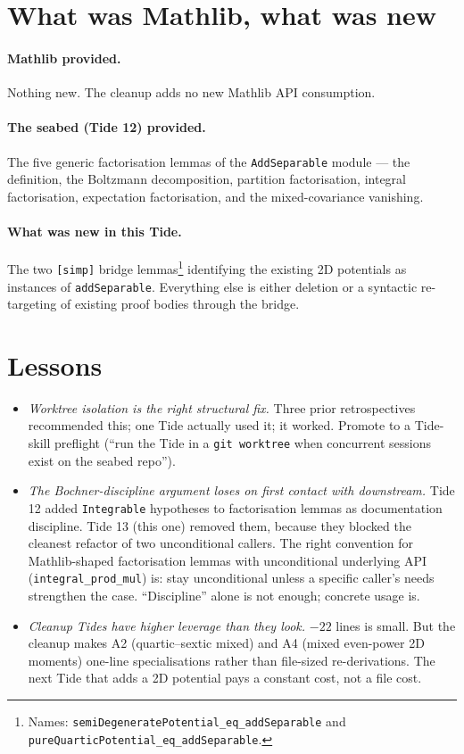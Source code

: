 \documentclass[11pt]{article}
\begin{document}
\section{What was Mathlib, what was new}

\paragraph{Mathlib provided.} Nothing new. The cleanup adds no new
Mathlib API consumption.

\paragraph{The seabed (Tide 12) provided.}
The five generic factorisation lemmas of the
\texttt{AddSeparable} module --- the definition, the Boltzmann
decomposition, partition factorisation, integral factorisation,
expectation factorisation, and the mixed-covariance vanishing.

\paragraph{What was new in this Tide.}
The two \texttt{[simp]} bridge lemmas\footnote{Names:
\texttt{semiDegeneratePotential\_eq\_addSeparable} and
\texttt{pureQuarticPotential\_eq\_addSeparable}.} identifying the
existing 2D potentials as instances of \texttt{addSeparable}.
Everything else is either deletion or a syntactic re-targeting of
existing proof bodies through the bridge.

\section{Lessons}

\begin{itemize}
\item \emph{Worktree isolation is the right structural fix.} Three
prior retrospectives recommended this; one Tide actually used it; it
worked. Promote to a Tide-skill preflight (``run the Tide in a
\texttt{git worktree} when concurrent sessions exist on the seabed
repo'').

\item \emph{The Bochner-discipline argument loses on first contact
with downstream.} Tide 12 added \texttt{Integrable} hypotheses to
factorisation lemmas as documentation discipline. Tide 13 (this one)
removed them, because they blocked the cleanest refactor of two
unconditional callers. The right convention for Mathlib-shaped
factorisation lemmas with unconditional underlying API
(\texttt{integral\_prod\_mul}) is: stay unconditional unless a
specific caller's needs strengthen the case. ``Discipline'' alone is
not enough; concrete usage is.

\item \emph{Cleanup Tides have higher leverage than they look.}
$-22$ lines is small. But the cleanup makes A2 (quartic--sextic mixed)
and A4 (mixed even-power 2D moments) one-line specialisations rather
than file-sized re-derivations. The next Tide that adds a 2D
potential pays a constant cost, not a file cost.
\end{itemize}
\end{document}
